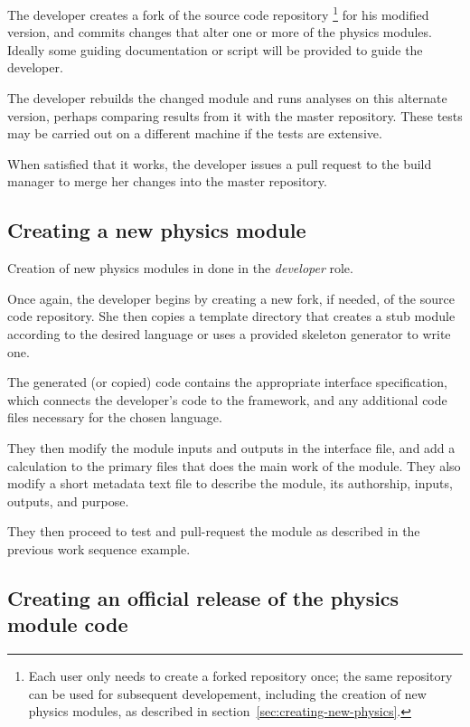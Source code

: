 \documentclass[draftmode,draftwater]{memarticle}
\begin{document}
The developer creates a fork of the source code repository%
\footnote{Each user only needs to create a forked repository once; the
  same repository can be used for subsequent developement, including the
  creation of new physics modules, as described in
  section~\ref{sec:creating-new-physics}.}
for his modified version,
and commits changes that alter one or more of the physics modules.
Ideally some guiding documentation or script will be provided to guide
the developer.

The developer rebuilds the changed module and runs analyses on this
alternate version, perhaps comparing results from it with the
master repository.  These tests may be carried out on a different machine if the
tests are extensive.

When satisfied that it works, the developer issues a pull
request to the build manager to merge her changes into the master
repository.

\subsection{Creating a new physics module\label{sec:creating-new-physics}}

Creation of new physics modules in done in the \emph{developer} role.

Once again, the developer begins by creating a new fork, if needed, of the source code
repository. She then copies a template directory
that creates a stub module according to the desired language or uses a provided skeleton generator to write one.

The generated (or copied) code contains the appropriate interface
specification,
which connects the developer's code to the
framework, and any additional code files necessary for the chosen language.

They then modify the module inputs and outputs in the interface file,
and add a
calculation to the primary files that does the main work of the module.
They also modify a short metadata text file to describe the
module, its authorship, inputs, outputs, and purpose.

They then proceed to test and pull-request the module as described in the
previous work sequence example.

\subsection{Creating an official release of the physics module code}
\end{document}
